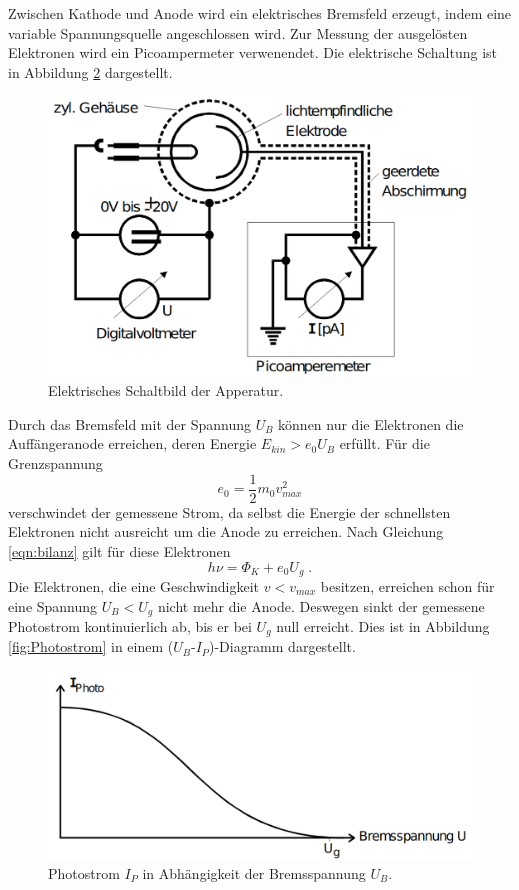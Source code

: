 \noindent
Zwischen Kathode und Anode wird ein elektrisches Bremsfeld erzeugt, indem eine variable Spannungsquelle angeschlossen wird. Zur Messung der 
ausgelösten Elektronen wird ein Picoampermeter verwenendet. Die elektrische Schaltung ist in Abbildung \ref{fig:Schaltung} dargestellt. 
\begin{figure}
    \centering
    \includegraphics[scale=0.3]{pictures/ElektischeSchaltung.png}
    \caption{Elektrisches Schaltbild der Apperatur. \cite{AP01}}
    \label{fig:Schaltung}
\end{figure}

\noindent
Durch das Bremsfeld mit der Spannung $U_B$ können nur die Elektronen die Auffängeranode erreichen, deren Energie $E_{kin}>e_0U_B$ erfüllt.
Für die Grenzspannung 
\begin{equation}
    e_0=\frac{1}{2}m_0v_{max}^2 
\end{equation}
verschwindet der gemessene Strom, da selbst die Energie der schnellsten Elektronen nicht ausreicht um die Anode zu erreichen. Nach 
Gleichung \eqref{eqn:bilanz} gilt für diese Elektronen 
\begin{equation}
    h\nu=\Phi_K+e_0U_g\;.
\end{equation}
Die Elektronen, die eine Geschwindigkeit $v<v_{max}$ besitzen, erreichen schon für eine Spannung $U_B<U_g$ nicht mehr die Anode. Deswegen 
sinkt der gemessene Photostrom kontinuierlich ab, bis er bei $U_g$ null erreicht. Dies ist in Abbildung \ref{fig:Photostrom} in einem 
($U_B$-$I_P$)-Diagramm dargestellt. 

\begin{figure}
    \centering
    \includegraphics[scale=0.3]{pictures/Photostrom.png}
    \caption{Photostrom $I_{P}$ in Abhängigkeit der Bremsspannung $U_B$. \cite{AP01}}
    \label{fig:Schaltung}
\end{figure}

